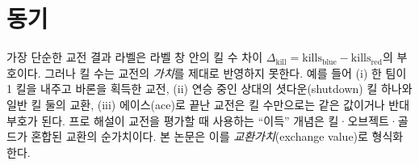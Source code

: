 
\section{동기}
\label{sec:label-motivation}

가장 단순한 교전 결과 라벨은 라벨 창 안의 킬 수 차이 $\Delta_{\mathrm{kill}} = \mathrm{kills}_{\mathrm{blue}} - \mathrm{kills}_{\mathrm{red}}$의 부호이다. 그러나 킬 수는 교전의 \emph{가치}를 제대로 반영하지 못한다. 예를 들어 (i) 한 팀이 1 킬을 내주고 바론을 획득한 교전, (ii) 연승 중인 상대의 셧다운(shutdown) 킬 하나와 일반 킬 둘의 교환, (iii) 에이스(ace)로 끝난 교전은 킬 수만으로는 같은 값이거나 반대 부호가 된다. 프로 해설이 교전을 평가할 때 사용하는 ``이득'' 개념은 킬·오브젝트·골드가 혼합된 교환의 순가치이다. 본 논문은 이를 \emph{교환가치}(exchange value)로 형식화한다.
